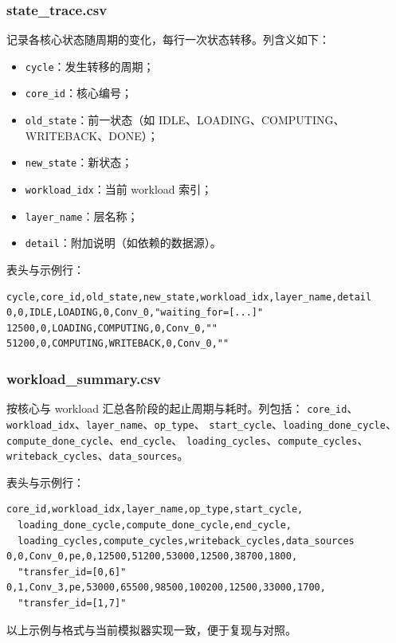 \subsubsection{state\_trace.csv}

记录各核心状态随周期的变化，每行一次状态转移。列含义如下：
\begin{itemize}
  \item \texttt{cycle}：发生转移的周期；
  \item \texttt{core\_id}：核心编号；
  \item \texttt{old\_state}：前一状态（如 IDLE、LOADING、COMPUTING、WRITEBACK、DONE）；
  \item \texttt{new\_state}：新状态；
  \item \texttt{workload\_idx}：当前 workload 索引；
  \item \texttt{layer\_name}：层名称；
  \item \texttt{detail}：附加说明（如依赖的数据源）。
\end{itemize}

表头与示例行：
{\small
\begin{verbatim}
cycle,core_id,old_state,new_state,workload_idx,layer_name,detail
0,0,IDLE,LOADING,0,Conv_0,"waiting_for=[...]"
12500,0,LOADING,COMPUTING,0,Conv_0,""
51200,0,COMPUTING,WRITEBACK,0,Conv_0,""
\end{verbatim}
}

\subsubsection{workload\_summary.csv}

按核心与 workload 汇总各阶段的起止周期与耗时。列包括：
\texttt{core\_id}、\texttt{workload\_idx}、\texttt{layer\_name}、\texttt{op\_type}、
\texttt{start\_cycle}、\texttt{loading\_done\_cycle}、\texttt{compute\_done\_cycle}、\texttt{end\_cycle}、
\texttt{loading\_cycles}、\texttt{compute\_cycles}、\texttt{writeback\_cycles}、\texttt{data\_sources}。

表头与示例行：
{\small
\begin{verbatim}
core_id,workload_idx,layer_name,op_type,start_cycle,
  loading_done_cycle,compute_done_cycle,end_cycle,
  loading_cycles,compute_cycles,writeback_cycles,data_sources
0,0,Conv_0,pe,0,12500,51200,53000,12500,38700,1800,
  "transfer_id=[0,6]"
0,1,Conv_3,pe,53000,65500,98500,100200,12500,33000,1700,
  "transfer_id=[1,7]"
\end{verbatim}
}

以上示例与格式与当前模拟器实现一致，便于复现与对照。

